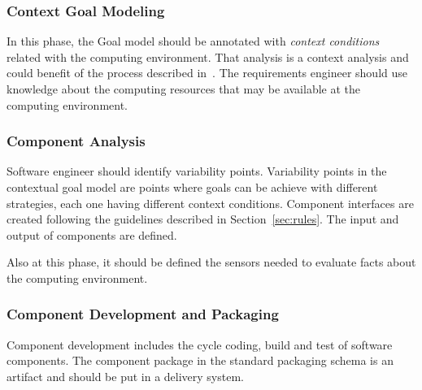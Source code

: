 \subsubsection{Context Goal Modeling}
In this phase, the Goal model should be annotated with \emph{context conditions} related with the computing environment. That analysis is a context analysis and could benefit of the process described in~\cite{ali_goal-based_2010}. The requirements engineer should use knowledge about the computing resources that may be available at the computing environment.


\subsubsection{Component Analysis}
Software engineer should identify variability points.
Variability points in the contextual goal model are points where goals can be achieve with different strategies, each one having different context conditions.
Component interfaces are created following the guidelines described in Section~\ref{sec:rules}. The input and output of components are defined.

Also at this phase, it should be defined the sensors needed to evaluate facts about the computing environment.

\subsubsection{Component Development and Packaging}

Component development includes the cycle coding, build and test of software components.
The component package in the standard packaging schema is an artifact and should be put in a delivery system.
